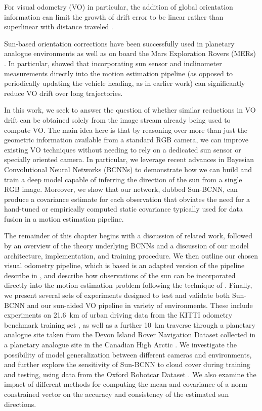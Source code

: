 For visual odometry (VO) in particular, the addition of global orientation information can limit the growth of drift error to be linear rather than superlinear with distance traveled \citep{Olson2003-ax}.

Sun-based orientation corrections have been successfully used in planetary analogue environments \citep{Furgale2011-zu,Lambert2012-sn} as well as on board the Mars Exploration Rovers (MERs) \citep{Eisenman2002-cg,Maimone2007-tc}.
In particular, \citet{Lambert2012-sn} showed that incorporating sun sensor and inclinometer measurements directly into the motion estimation pipeline (as opposed to periodically updating the vehicle heading, as in earlier work) can significantly reduce VO drift over long trajectories.


In this work, we seek to answer the question of whether similar reductions in VO drift can be obtained solely from the image stream already being used to compute VO.
The main idea here is that by reasoning over more than just the geometric information available from a standard RGB camera, we can improve existing VO techniques without needing to rely on a dedicated sun sensor or specially oriented camera.
In particular, we leverage recent advances in Bayesian Convolutional Neural Networks (BCNNs) to demonstrate how we can build and train a deep model capable of inferring the direction of the sun from a single RGB image. 
Moreover, we show that our network, dubbed Sun-BCNN, can produce a covariance estimate for each observation that obviates the need for a hand-tuned or empirically computed static covariance typically used for data fusion in a motion estimation pipeline. 




The remainder of this chapter begins with a discussion of related work, followed by an overview of the theory underlying BCNNs and a discussion of our model architecture, implementation, and training procedure.
We then outline our chosen visual odometry pipeline, which is based is an adapted version of the pipeline describe in , and describe how observations of the sun can be incorporated directly into the motion estimation problem following the technique of \citet{Lambert2012-sn}.
Finally, we present several sets of experiments designed to test and validate both Sun-BCNN and our sun-aided VO pipeline in variety of environments.
These include experiments on 21.6~km of urban driving data from the KITTI odometry benchmark training set \citep{Geiger2013-ky}, as well as a further 10~km traverse through a planetary analogue site taken from the Devon Island Rover Navigation Dataset collected in a planetary analogue site in the Canadian High Arctic \citep{Furgale2012-kk}.
We investigate the possibility of model generalization between different cameras and environments, and further explore the sensitivity of Sun-BCNN to cloud cover during training and testing, using data from the Oxford Robotcar Dataset \citep{Maddern2016-ng}.
We also examine the impact of different methods for computing the mean and covariance of a norm-constrained vector on the accuracy and consistency of the estimated sun directions.

